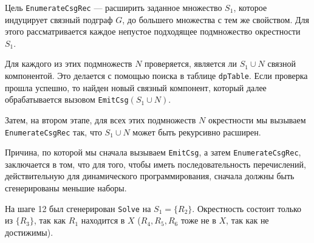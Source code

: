 \documentclass[12pt]{article}
\begin{document}
\begin{flushleft}
Цель \texttt{EnumerateCsgRec} — расширить заданное множество $S_1$,  
которое индуцирует связный подграф $G$, до большего множества с тем же свойством.  
Для этого рассматривается каждое непустое подходящее подмножество окрестности $S_1$.  

Для каждого из этих подмножеств $N$ проверяется,  
является ли $S_1 \cup N$ связной компонентой.  
Это делается с помощью поиска в таблице \texttt{dpTable}.  
Если проверка прошла успешно, то найден новый связный компонент,  
который далее обрабатывается вызовом \texttt{EmitCsg}$(S_1 \cup N)$.  

Затем, на втором этапе, для всех этих подмножеств $N$ окрестности  
мы вызываем \texttt{EnumerateCsgRec} так,  
что $S_1 \cup N$ может быть рекурсивно расширен.  

Причина, по которой мы сначала вызываем \texttt{EmitCsg},  
а затем \texttt{EnumerateCsgRec}, заключается в том,  
что для того, чтобы иметь последовательность перечислений,  
действительную для динамического программирования,  
сначала должны быть сгенерированы меньшие наборы.  

\begin{center}
\end{center}

На шаге 12 был сгенерирован \texttt{Solve} на $S_1 = \{R_2\}$.  
Окрестность состоит только из $\{R_3\}$, так как $R_1$ находится в $X$  
($R_4, R_5, R_6$ тоже не в $X$, так как не достижимы).  


\end{flushleft}
\end{document}
